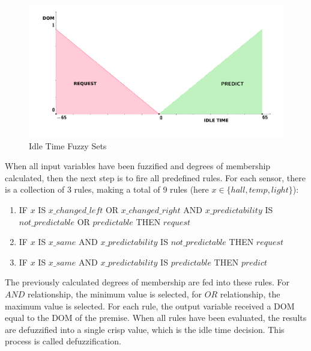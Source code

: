 \begin{figure}[h!]
\centering
\includegraphics[scale=0.58]{4/figures/result_sets.pdf}
\caption{Idle Time Fuzzy Sets}
\label{idle_sets}
\end{figure}

When all input variables have been fuzzified and degrees of membership calculated, then the next step is to fire all predefined rules. For each sensor, there is a collection of 3 rules, making a total of 9 rules (here $x \in \{hall, temp, light\}$):


\begin{enumerate}
\item IF $x$ IS $x\_changed\_left$ OR $x\_changed\_right$ AND $x\_predictability$ IS $not\_predictable$ OR $predictable$ THEN $request$
\item IF $x$ IS $x\_same$ AND $x\_predictability$ IS $not\_predictable$ THEN $request$
\item IF $x$ IS $x\_same$ AND $x\_predictability$ IS $predictable$ THEN $predict$
\end{enumerate}

The previously calculated degrees of membership are fed into these rules. For $AND$ relationship, the minimum value is selected, for $OR$ relationship, the maximum value is selected. For each rule, the output variable received a DOM equal to the DOM of the premise. When all rules have been evaluated, the results are defuzzified into a single crisp value, which is the idle time decision. This process is called defuzzification.

